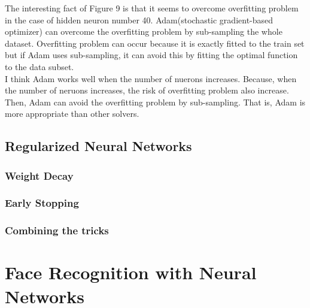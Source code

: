 \documentclass[a4paper]{article}
\begin{document}
The interesting fact of Figure 9 is that it seems to overcome overfitting problem in the case of hidden neuron number 40. Adam(stochastic gradient-based optimizer) can overcome the overfitting problem by sub-sampling the whole dataset. Overfitting problem can occur because it is exactly fitted to the train set but if Adam uses sub-sampling, it can avoid this by fitting the optimal function to the data subset.\\
I think Adam works well when the number of nuerons increases. Because, when the number of neruons increases, the risk of overfitting problem also increase. Then, Adam can avoid the overfitting problem by sub-sampling. That is, Adam is more appropriate than other solvers.
\subsection{Regularized Neural Networks}
\subsubsection{Weight Decay}
\subsubsection{Early Stopping}
\subsubsection{Combining the tricks}
\section{Face Recognition with Neural Networks}
\end{document}
